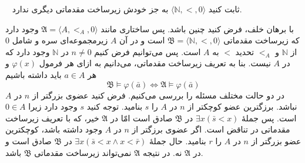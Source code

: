 ~
ثابت کنید $\langle \mathbb{N}, <, 0 \rangle$ به جز خودش زیرساخت مقدماتی دیگری ندارد.
\begin{ans}
  با برهان خلف، فرض کنید چنین باشد. پس ساختاری مانند $\mathfrak{A} = \langle A, <_A, 0 \rangle$ وجود دارد که زیرساخت مقدماتی $\mathfrak{B} = \langle \mathbb{N}, <, 0 \rangle$ است و در آن $A$ زیرمجموعه‌ای سره و شامل $0$ از $\mathbb{N}$ و $<_A$ تحدید $<$ به $A$ است. پس می‌توانیم فرض کنیم $n \neq 0$ در $\mathbb{N}$ وجود دارد که در $A$ نیست. بنا به تعریف زیرساخت مقدماتی، می‌دانیم به ازای هر فرمول $\varphi(x)$ و هر $a \in A$ باید داشته باشیم
  \[ \mathfrak{B} \vDash \varphi(\bar{a}) \iff \mathfrak{A} \vDash \varphi(\bar{a}) \]
  در دو حالت مختلف مسئله را بررسی می‌کنیم. فرض کنید عضوی بزرگتر از $n$ در $A$ نباشد. برزگترین عضو کوچکتر از $n$ در $A$ را $s$ بنامید. توجه کنید $s$ وجود دارد زیرا $0 \in A$ است. پس جملهٔ $\exists x (\bar{s} < x)$ در $\mathfrak{B}$ صادق است امّا در $\mathfrak{A}$ خیر، که با تعریف زیرساخت مقدماتی در تناقض است. اگر عضوی برزگتر از $n$ در $A$ وجود داشته باشد، کوچکترین عضو بزرگتر از $n$ در $A$ را $r$ بنامید. حال جملهٔ $\exists x (\bar{s} < x \wedge x < \bar{r})$ در $\mathfrak{B}$ صادق است و در $\mathfrak{A}$ نه. در نتیجه $\mathfrak{A}$ نمی‌تواند زیرساخت مقدماتی $\mathfrak{B}$ باشد.
\end{ans}